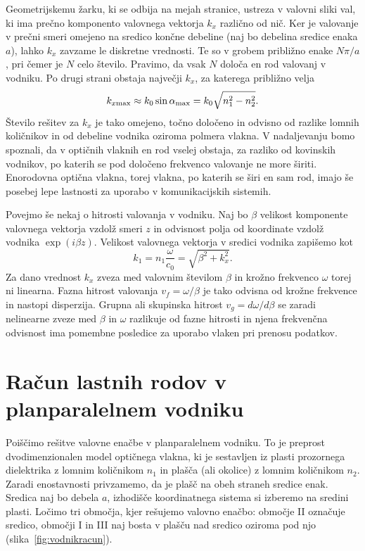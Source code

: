 Geometrijskemu žarku, ki se odbija na mejah stranice, ustreza v 
valovni sliki val, ki ima prečno komponento valovnega
vektorja $k_{x}$ različno od nič. Ker je valovanje v prečni smeri 
omejeno na sredico končne debeline (naj bo debelina sredice enaka $a$), lahko
$k_{x}$ zavzame le diskretne vrednosti. Te so v grobem približno enake 
$N\pi/a$, pri čemer je $N$
celo število. Pravimo, da vsak $N$ določa en rod valovanj v vodniku. Po drugi strani 
obstaja največji $k_x$, za katerega približno velja
\begin{equation}
k_{x \mathrm{max}} \approx k_0 \sin\alpha_{\rm max} = k_0 \sqrt{n_1^2 -n_2^2}.
\end{equation}
Število rešitev za $k_x$ je tako omejeno, točno določeno in odvisno
od razlike lomnih količnikov in od debeline vodnika oziroma polmera vlakna. 
V nadaljevanju bomo spoznali, da v optičnih vlaknih en rod vselej obstaja,
za razliko od kovinskih vodnikov, po katerih se pod določeno frekvenco
valovanje ne more širiti. Enorodovna optična vlakna, torej vlakna, po katerih se širi
en sam rod, imajo še posebej lepe lastnosti za uporabo v komunikacijskih
sistemih.

Povejmo še nekaj o hitrosti valovanja v vodniku.
Naj bo $\beta$ velikost komponente valovnega vektorja vzdolž smeri $z$ in odvisnost 
polja od koordinate vzdolž vodnika $\exp (i\beta z)$. Velikost
valovnega vektorja v sredici vodnika zapišemo kot
\begin{equation}
k_1 = n_{1}\frac{\omega}{c_0}=\sqrt{\beta^{2}+k_{x}^{2}}
\label{9.0}.
\end{equation}
Za dano vrednost $k_{x}$ zveza med valovnim številom $\beta$
in krožno frekvenco $\omega$ torej 
ni linearna. Fazna hitrost 
valovanja $v_{f}=\omega/\beta$ je tako
odvisna od krožne frekvence in nastopi disperzija. Grupna ali skupinska
hitrost $v_{g}=d\omega/d\beta$ 
se zaradi nelinearne zveze med $\beta$ in $\omega$ 
razlikuje od fazne hitrosti in njena frekvenčna odvisnost 
ima pomembne posledice za uporabo vlaken pri prenosu podatkov. 

\section{Račun lastnih rodov v planparalelnem vodniku}
Poiščimo rešitve valovne enačbe v planparalelnem vodniku. 
To je preprost dvodimenzionalen model optičnega vlakna, ki je sestavljen iz 
plasti prozornega dielektrika z lomnim količnikom $n_1$ in plašča (ali okolice) z lomnim količnikom $n_2$.
Zaradi enostavnosti privzamemo, da je plašč na obeh straneh sredice enak.
Sredica naj bo debela $a$, izhodišče koordinatnega sistema
si izberemo na sredini plasti. Ločimo tri območja, kjer rešujemo valovno enačbo:
območje II označuje sredico, območji I in III naj bosta v plašču nad sredico oziroma pod njo
(slika~\ref{fig:vodnikracun}).

